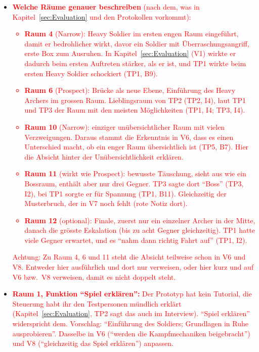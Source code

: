 \documentclass[../Main.tex]{subfiles}
\begin{document}
\begin{itemize}[leftmargin=1.5cm]
    \item \textcolor{red}{\textbf{Welche Räume genauer beschreiben} (nach dem, was in Kapitel~\ref{sec:Evaluation} und den Protokollen vorkommt):
            \begin{itemize}
                \item \textbf{Raum 4} (Narrow): Heavy Soldier im ersten engen Raum eingeführt, damit er bedrohlicher wirkt, davor ein Soldier mit Überraschungsangriff, erste Box zum Ausruhen. In Kapitel~\ref{sec:Evaluation} (V1) wirkte er dadurch beim ersten Auftreten stärker, als er ist, und TP1 wirkte beim ersten Heavy Soldier schockiert (TP1, B9).
                \item \textbf{Raum 6} (Prospect): Brücke als neue Ebene, Einführung des Heavy Archers im grossen Raum. Lieblingsraum von TP2 (TP2, I4), laut TP1 und TP3 der Raum mit den meisten Möglichkeiten (TP1, I4; TP3, I4).
                \item \textbf{Raum 10} (Narrow): einziger unübersichtlicher Raum mit vielen Verzweigungen. Daraus stammt die Erkenntnis in V6, dass es einen Unterschied macht, ob ein enger Raum übersichtlich ist (TP5, B7). Hier die Absicht hinter der Unübersichtlichkeit erklären.
                \item \textbf{Raum 11} (wirkt wie Prospect): bewusste Täuschung, sieht aus wie ein Bossraum, enthält aber nur drei Gegner. TP3 sagte dort \enquote{Boss} (TP3, I2), bei TP1 sorgte er für Spannung (TP1, B11). Gleichzeitig der Musterbruch, der in V7 noch fehlt (rote Notiz dort).
                \item \textbf{Raum 12} (optional): Finale, zuerst nur ein einzelner Archer in der Mitte, danach die grösste Eskalation (bis zu acht Gegner gleichzeitig). TP1 hatte viele Gegner erwartet, und es \enquote{nahm dann richtig Fahrt auf} (TP1, I2).
            \end{itemize}
        Achtung: Zu Raum 4, 6 und 11 steht die Absicht teilweise schon in V6 und V8. Entweder hier ausführlich und dort nur verweisen, oder hier kurz und auf V6 bzw.\ V8 verweisen, damit es nicht doppelt steht.}
    \item \textcolor{red}{\textbf{Raum 1, Funktion \enquote{Spiel erklären}:} Der Prototyp hat kein Tutorial, die Steuerung habt ihr den Testpersonen mündlich erklärt (Kapitel~\ref{sec:Evaluation}, TP2 sagt das auch im Interview). \enquote{Spiel erklären} widerspricht dem. Vorschlag: \enquote{Einführung des Soldiers; Grundlagen in Ruhe ausprobieren}. Dasselbe in V6 (\enquote{werden die Kampfmechaniken beigebracht}) und V8 (\enquote{gleichzeitig das Spiel erklären}) anpassen.}
\end{itemize}
\end{document}

